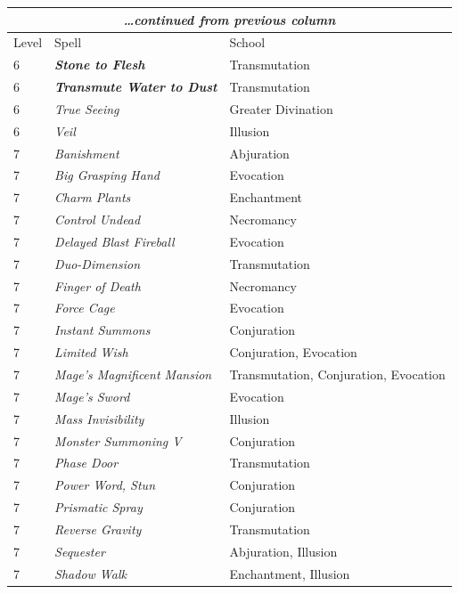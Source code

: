 \begin{multicols}{2}
\noindent
\begin{tabular}{|p{}|p{}|p{}|}
\multicolumn{3}{c}{\textit{\ldots continued from previous column}} \\
\hline
Level	& Spell	& School \\
\hline\hline
\rowcolor[gray]{.9}6	& \textbf{\textit{Stone to Flesh}}	& Transmutation \\
6	& \textbf{\textit{Transmute Water to Dust}}	& Transmutation \\
\rowcolor[gray]{.9}6	& \textit{True Seeing}	& Greater Divination \\
6	& \textit{Veil}	& Illusion \\
\rowcolor[gray]{.9}7	& \textit{Banishment}	& Abjuration \\
7	& \textit{Big Grasping Hand}	& Evocation \\
\rowcolor[gray]{.9}7	& \textit{Charm Plants}	& Enchantment \\
7	& \textit{Control Undead}	& Necromancy \\
\rowcolor[gray]{.9}7	& \textit{Delayed Blast Fireball}	& Evocation \\
7	& \textit{Duo-Dimension}	& Transmutation \\
\rowcolor[gray]{.9}7	& \textit{Finger of Death}	& Necromancy \\
7	& \textit{Force Cage}	& Evocation \\
\rowcolor[gray]{.9}7	& \textit{Instant Summons}	& Conjuration \\
7	& \textit{Limited Wish}	& Conjuration, Evocation \\
\rowcolor[gray]{.9}7	& \textit{Mage's Magnificent Mansion}	& Transmutation, Conjuration, Evocation \\
7	& \textit{Mage's Sword}	& Evocation \\
\rowcolor[gray]{.9}7	& \textit{Mass Invisibility}	& Illusion \\
7	& \textit{Monster Summoning V}	& Conjuration \\
\rowcolor[gray]{.9}7	& \textit{Phase Door}	& Transmutation \\
7	& \textit{Power Word, Stun}	& Conjuration \\
\rowcolor[gray]{.9}7	& \textit{Prismatic Spray}	& Conjuration \\
7	& \textit{Reverse Gravity}	& Transmutation \\
\rowcolor[gray]{.9}7	& \textit{Sequester}	& Abjuration, Illusion \\
7	& \textit{Shadow Walk}	& Enchantment, Illusion \\

\end{tabular}
\end{multicols}
